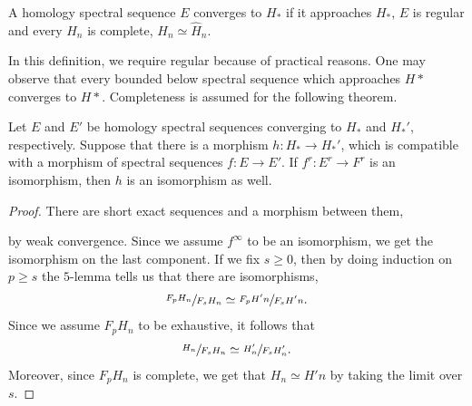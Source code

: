 \documentclass[../thesis.tex]{subfiles}
\begin{document}
        \begin{definition}[Convergence]
            A homology spectral sequence $E$ converges to $H_*$ if it approaches $H_*$, $E$ is regular and every $H_n$ is complete, $H_n \simeq \widehat{H}_n$.
        \end{definition}

        In this definition, we require regular because of practical reasons. One may observe that every bounded below spectral sequence which approaches $H*$ converges to $H*$. Completeness is assumed for the following theorem. 

        \begin{thm}\label{thm: comp-thm}
            Let $E$ and $E'$ be homology spectral sequences converging to $H_*$ and $H_*'$, respectively. Suppose that there is a morphism $h: H_* \rightarrow H_*'$, which is compatible with a morphism of spectral sequences $f: E \rightarrow E'$. If $f^r: E^r \rightarrow F^r$ is an isomorphism, then $h$ is an isomorphism as well.
        \end{thm}

        \begin{proof}
            There are short exact sequences and a morphism between them,
            \begin{center}
            \end{center}
            by weak convergence. Since we assume $f^\infty$ to be an isomorphism, we get the isomorphism on the last component. If we fix $s \geq 0$, then by doing induction on $p \geq s$ the $5$-lemma tells us that there are isomorphisms,
            \begin{align*}
                \sfrac{F_p H_n}{F_s H_n} \simeq \sfrac{F_p H'n}{F_s H'n}\text{.}
            \end{align*}
            Since we assume $F_pH_n$ to be exhaustive, it follows that
            \begin{align*}
                \sfrac{H_n}{F_sH_n} \simeq \sfrac{H'_n}{F_s H'_n}\text{.}
            \end{align*}
            Moreover, since $F_pH_n$ is complete, we get that $H_n \simeq H'n$ by taking the limit over $s$.
        \end{proof}
\end{document}
